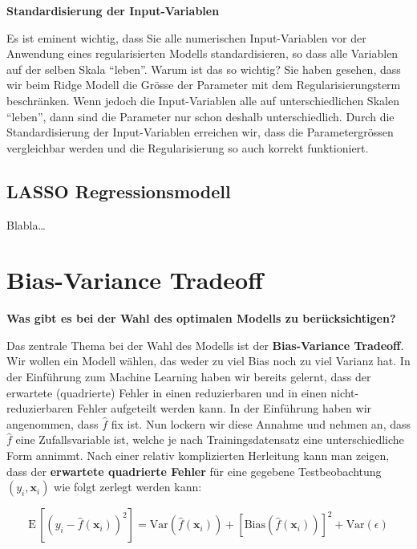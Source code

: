 \documentclass[
]{book}
\begin{document}
\textbf{Standardisierung der Input-Variablen}

Es ist eminent wichtig, dass Sie alle numerischen Input-Variablen vor der Anwendung eines regularisierten Modells standardisieren, so dass alle Variablen auf der selben Skala ``leben''. Warum ist das so wichtig? Sie haben gesehen, dass wir beim Ridge Modell die Grösse der Parameter mit dem Regularisierungsterm beschränken. Wenn jedoch die Input-Variablen alle auf unterschiedlichen Skalen ``leben'', dann sind die Parameter nur schon deshalb unterschiedlich. Durch die Standardisierung der Input-Variablen erreichen wir, dass die Parametergrössen vergleichbar werden und die Regularisierung so auch korrekt funktioniert.

\hypertarget{lasso-regressionsmodell}{%
\subsection{LASSO Regressionsmodell}\label{lasso-regressionsmodell}}

Blabla\ldots{}

\hypertarget{bias-variance-tradeoff}{%
\section{Bias-Variance Tradeoff}\label{bias-variance-tradeoff}}

\textbf{Was gibt es bei der Wahl des optimalen Modells zu berücksichtigen?}

Das zentrale Thema bei der Wahl des Modells ist der \textbf{Bias-Variance Tradeoff}. Wir wollen ein Modell wählen, das weder zu viel Bias noch zu viel Varianz hat. In der Einführung zum Machine Learning haben wir bereits gelernt, dass der erwartete (quadrierte) Fehler in einen reduzierbaren und in einen nicht-reduzierbaren Fehler aufgeteilt werden kann. In der Einführung haben wir angenommen, dass \(\hat{f}\) fix ist. Nun lockern wir diese Annahme und nehmen an, dass \(\hat{f}\) eine Zufallsvariable ist, welche je nach Trainingsdatensatz eine unterschiedliche Form annimmt. Nach einer relativ komplizierten Herleitung kann man zeigen, dass der \textbf{erwartete quadrierte Fehler} für eine gegebene Testbeobachtung \((y_i,\mathbf{x}_i)\) wie folgt zerlegt werden kann:

\[
\text{E}\,\left[\left(y_i - \hat{f}(\mathbf{x}_i)\right)^2\right] = \text{Var}\left(\hat{f}(\mathbf{x}_i)\right) + \left[\text{Bias}\left(\hat{f}(\mathbf{x}_i)\right)\right]^2 + \text{Var}(\epsilon)
\]
\end{document}
